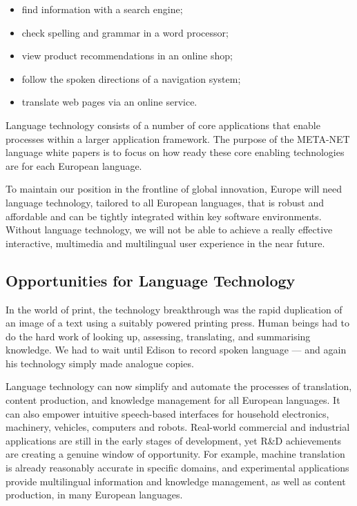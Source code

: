 \documentclass[]{../metanetpaper}
\begin{document}
\begin{multicols}{2}
\begin{itemize}
\item find information with a search engine;
\item check spelling and grammar in a word processor;
\item view product recommendations in an online shop;
\item follow the spoken directions of a navigation system;
\item translate web pages via an online service.
\end{itemize}

Language technology consists of a number of core applications that enable processes within a larger application framework. The purpose of the META-NET language white papers is to focus on how ready these core enabling technologies are for each European language. 


To maintain our position in the frontline of global innovation, Europe will need language technology, tailored to all European languages, that is robust and affordable and can be tightly integrated within key software environments. Without language technology, we will not be able to achieve a really effective interactive, multimedia and multilingual user experience in the near future.

\subsection{Opportunities for Language Technology}

In the world of print, the technology breakthrough was the rapid duplication of an image of a text using a suitably powered printing press. Human beings had to do the hard work of looking up, assessing, translating, and summarising knowledge. We had to wait until Edison to record spoken language --- and again his technology simply made analogue copies.

Language technology can now simplify and automate the processes of translation, content production, and knowledge management for all European languages. It can also empower intuitive speech-based interfaces for household electronics, machinery, vehicles, computers and robots. Real-world commercial and industrial applications are still in the early stages of development, yet R\&D achievements are creating a genuine window of opportunity. For example, machine translation is already reasonably accurate in specific domains, and experimental applications provide multilingual information and knowledge management, as well as content production, in many European languages. 


\end{multicols}
\end{document}
